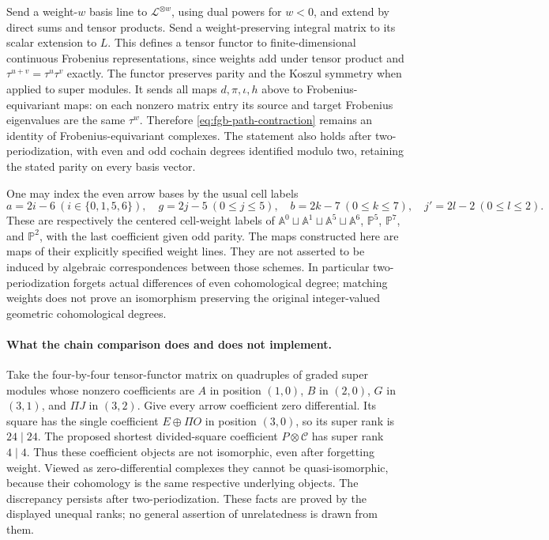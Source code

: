 Send a weight-$w$ basis line to $\mathcal L^{\otimes w}$, using dual
powers for $w<0$, and extend by direct sums and tensor products.
Send a weight-preserving integral matrix to its scalar extension to $L$.
This defines a tensor functor to finite-dimensional continuous
Frobenius representations, since weights add under tensor product and
$\tau^{u+v}=\tau^u\tau^v$ exactly. The functor preserves parity and
the Koszul symmetry when applied to super modules. It sends all maps
$d,\pi,\iota,h$ above to Frobenius-equivariant maps: on each nonzero
matrix entry its source and target Frobenius eigenvalues are the same
$\tau^w$. Therefore \eqref{eq:fgb-path-contraction} remains an identity
of Frobenius-equivariant complexes. The statement also holds after
two-periodization, with even and odd cochain degrees identified modulo
two, retaining the stated parity on every basis vector.

One may index the even arrow bases by the usual cell labels
\[
 a=2i-6\ (i\in\{0,1,5,6\}),\quad
 g=2j-5\ (0\leq j\leq5),\quad
 b=2k-7\ (0\leq k\leq7),\quad
 j'=2l-2\ (0\leq l\leq2).
\]
These are respectively the centered cell-weight labels of
$\mathbb A^0\sqcup\mathbb A^1\sqcup\mathbb A^5\sqcup\mathbb A^6$,
$\mathbb P^5$, $\mathbb P^7$, and $\mathbb P^2$, with the last
coefficient given odd parity. The maps constructed here are maps of
their explicitly specified weight lines. They are not asserted to be
induced by algebraic correspondences between those schemes. In
particular two-periodization forgets actual differences of even
cohomological degree; matching weights does not prove an isomorphism
preserving the original integer-valued geometric cohomological degrees.

\paragraph{What the chain comparison does and does not implement.}
Take the four-by-four tensor-functor matrix on quadruples of graded
super modules whose nonzero coefficients are $A$ in position $(1,0)$,
$B$ in $(2,0)$, $G$ in $(3,1)$, and $\Pi J$ in $(3,2)$. Give every
arrow coefficient zero differential. Its square has the single
coefficient $E\oplus\Pi O$ in position $(3,0)$, so its super rank is
$24\mid24$. The proposed shortest divided-square coefficient
$P\otimes\mathcal C$ has super rank $4\mid4$. Thus these coefficient
objects are not isomorphic, even after forgetting weight. Viewed as
zero-differential complexes they cannot be quasi-isomorphic, because
their cohomology is the same respective underlying objects. The
discrepancy persists after two-periodization. These facts are proved
by the displayed unequal ranks; no general assertion of unrelatedness
is drawn from them.


